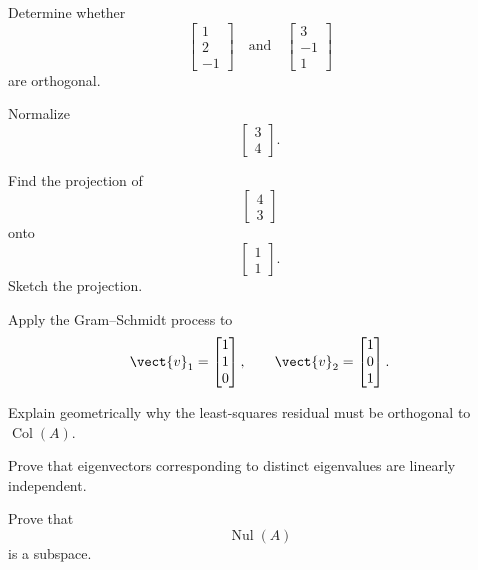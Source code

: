 \begin{exercise}[2]
Determine whether
\[ \begin{bmatrix}1\\2\\-1\end{bmatrix}
\quad\text{and}\quad
\begin{bmatrix}3\\-1\\1\end{bmatrix} \]
are orthogonal.
\end{exercise}

\begin{exercise}[2]
Normalize
\[ \begin{bmatrix}3\\4\end{bmatrix}. \]
\end{exercise}

\begin{exercise}[2]
Find the projection of
\[ \begin{bmatrix}4\\3\end{bmatrix} \]
onto
\[ \begin{bmatrix}1\\1\end{bmatrix}. \]
Sketch the projection.
\end{exercise}

\begin{exercise}[3]
Apply the Gram--Schmidt process to
\[ \vect{v}_1=\begin{bmatrix}1\\1\\0\end{bmatrix},
\qquad
\vect{v}_2=\begin{bmatrix}1\\0\\1\end{bmatrix}. \]
\end{exercise}

\begin{exercise}[3]
Explain geometrically why the least-squares residual must be orthogonal to
\(\operatorname{Col}(A)\).
\end{exercise}

\begin{exercise}[3]
Prove that eigenvectors corresponding to distinct eigenvalues are linearly
independent.
\end{exercise}

\begin{exercise}[3]
Prove that
\[ \operatorname{Nul}(A) \]
is a subspace.
\end{exercise}

